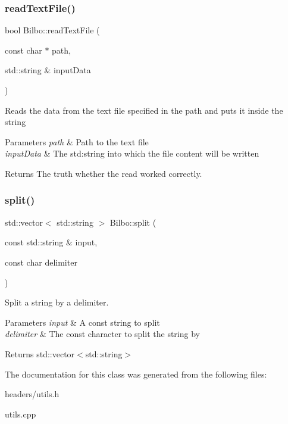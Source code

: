 \subsubsection{read\+Text\+File()}
{\footnotesize\ttfamily bool Bilbo\+::read\+Text\+File (\begin{DoxyParamCaption}\item[{const char $\ast$}]{path,  }\item[{std\+::string \&}]{input\+Data }\end{DoxyParamCaption})}

Reads the data from the text file specified in the path and puts it inside the string 
\begin{DoxyParams}{Parameters}
{\em path} & Path to the text file \\
\hline
{\em input\+Data} & The std\+:string into which the file content will be written \\
\hline
\end{DoxyParams}
\begin{DoxyReturn}{Returns}
The truth whether the read worked correctly. 
\end{DoxyReturn}
\mbox{\label{class_bilbo_abbafbc1117d01287115c7ebd08114c59}} 
\subsubsection{split()}
{\footnotesize\ttfamily std\+::vector$<$ std\+::string $>$ Bilbo\+::split (\begin{DoxyParamCaption}\item[{const std\+::string \&}]{input,  }\item[{const char}]{delimiter }\end{DoxyParamCaption})}



Split a string by a delimiter. 


\begin{DoxyParams}{Parameters}
{\em input} & A const string to split \\
\hline
{\em delimiter} & The const character to split the string by \\
\hline
\end{DoxyParams}
\begin{DoxyReturn}{Returns}
std\+::vector$<$std\+::string$>$ 
\end{DoxyReturn}


The documentation for this class was generated from the following files\+:\begin{DoxyCompactItemize}
\item 
headers/utils.\+h\item 
utils.\+cpp\end{DoxyCompactItemize}
